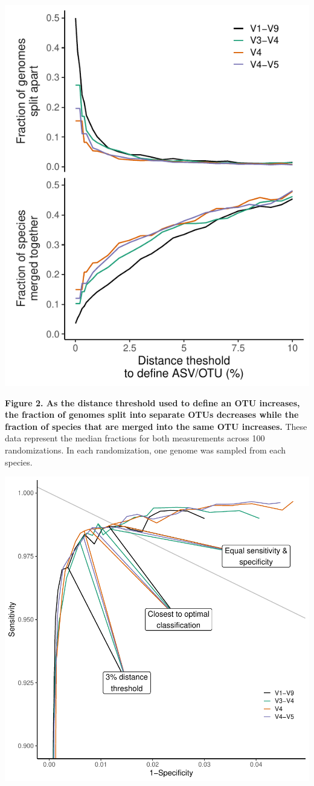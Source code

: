 \documentclass[
]{article}
\begin{document}
\newpage

\includegraphics{../figures/lump_split.pdf}

\textbf{Figure 2. As the distance threshold used to define an OTU
increases, the fraction of genomes split into separate OTUs decreases
while the fraction of species that are merged into the same OTU
increases.} These data represent the median fractions for both
measurements across 100 randomizations. In each randomization, one
genome was sampled from each species.

\newpage

\includegraphics{../figures/roc_curve.pdf}
\end{document}
